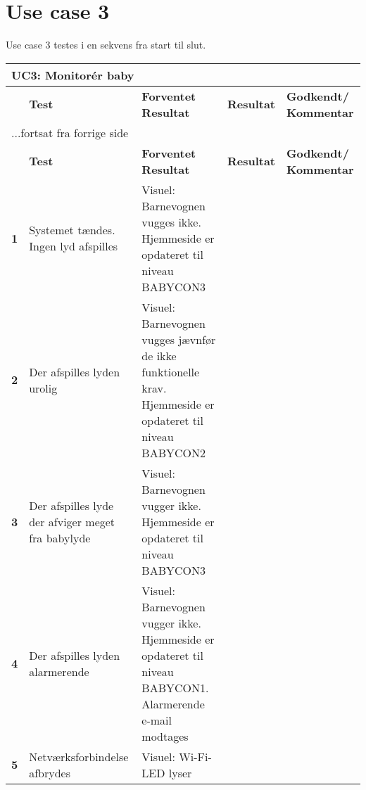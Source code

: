 \section*{Use case 3}

Use case 3 testes i en sekvens fra start til slut.

\begin{center}
	\label{accepttest:uc3} 
\begin{longtable}{|p{}|p{}|p{}|p{}|p{}|} %
\hline
\multicolumn{5}{|l|}{\textbf{UC3: Monitorér baby}} \\ \hline
\multicolumn{1}{|c|}{} &
\textbf{Test} &
\textbf{Forventet \newline Resultat} &
\textbf{Resultat} &
\textbf{Godkendt/ \newline Kommentar} \\ \hline 
\endfirsthead

\multicolumn{5}{l}{...fortsat fra forrige side} \\ \hline 
\multicolumn{1}{|c|}{} &
\textbf{Test} &
\textbf{Forventet \newline Resultat} &
\textbf{Resultat} &
\textbf{Godkendt/ \newline Kommentar} \\ \hline 
\endhead



\textbf{1}	&Systemet tændes. Ingen lyd afspilles
			&Visuel: Barnevognen vugges ikke. 
			 Hjemmeside er opdateret til niveau BABYCON3
			&
			& 
			\\\hline

\textbf{2}	&Der afspilles lyden urolig
			&Visuel: Barnevognen vugges jævnfør de ikke 
			 funktionelle krav. Hjemmeside er opdateret 
			 til niveau BABYCON2
			&
			&
			\\\hline
			 
\textbf{3}	&Der afspilles lyde der afviger meget fra babylyde
			&Visuel: Barnevognen vugger ikke.
			 Hjemmeside er opdateret til niveau BABYCON3
			&
			&
			\\\hline			 
			 
\textbf{4}	&Der afspilles lyden alarmerende
			&Visuel: Barnevognen vugger ikke. Hjemmeside 
			 er opdateret til niveau BABYCON1. 
			 Alarmerende e-mail modtages
			&
			&
			\\\hline

\textbf{5}  &Netværksforbindelse afbrydes
			&Visuel: Wi-Fi-LED lyser
			&
			&
			\\\hline			
			
\end{longtable}
\end{center}
